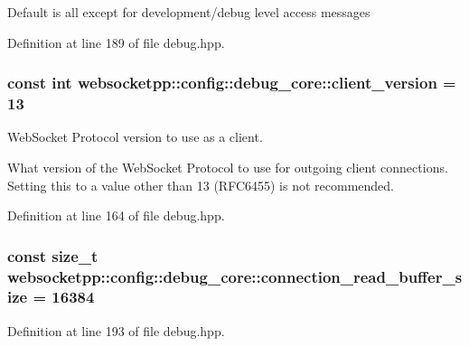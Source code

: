 Default is all except for development/debug level access messages 

Definition at line 189 of file debug.\+hpp.

\hypertarget{structwebsocketpp_1_1config_1_1debug__core_a2749c03e9600b76c6ee5c1184919f2f7}{}
\subsubsection[{client\+\_\+version}]{\setlength{\rightskip}{0pt plus 5cm}const int websocketpp\+::config\+::debug\+\_\+core\+::client\+\_\+version = 13\hspace{0.3cm}{\ttfamily [static]}}\label{structwebsocketpp_1_1config_1_1debug__core_a2749c03e9600b76c6ee5c1184919f2f7}


Web\+Socket Protocol version to use as a client. 

What version of the Web\+Socket Protocol to use for outgoing client connections. Setting this to a value other than 13 (R\+F\+C6455) is not recommended. 

Definition at line 164 of file debug.\+hpp.

\hypertarget{structwebsocketpp_1_1config_1_1debug__core_a7980b627f735f03d4e48d39d949dcb0a}{}
\subsubsection[{connection\+\_\+read\+\_\+buffer\+\_\+size}]{\setlength{\rightskip}{0pt plus 5cm}const size\+\_\+t websocketpp\+::config\+::debug\+\_\+core\+::connection\+\_\+read\+\_\+buffer\+\_\+size = 16384\hspace{0.3cm}{\ttfamily [static]}}\label{structwebsocketpp_1_1config_1_1debug__core_a7980b627f735f03d4e48d39d949dcb0a}


Definition at line 193 of file debug.\+hpp.

\hypertarget{structwebsocketpp_1_1config_1_1debug__core_a0f046a730b161555c644dc40df9ea870}{}

